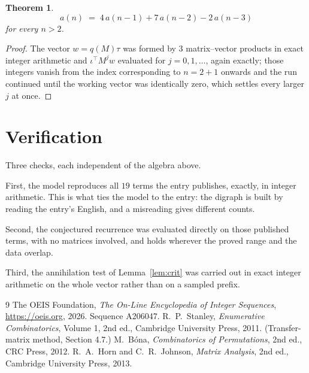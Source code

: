 \documentclass[11pt,a4paper]{article}
\theoremstyle{plain}
\newtheorem{theorem}{Theorem}
\theoremstyle{definition}
\begin{document}
\begin{theorem}
\[
a(n)\;=\;4\,a(n-1) + 7\,a(n-2) - 2\,a(n-3)
\]
for every $n>2$.
\end{theorem}

\begin{proof}
The vector $w=q(M)\tau$ was formed by $3$ matrix--vector products in exact integer
arithmetic and $\iota^{\!\top}M^{j}w$ evaluated for $j=0,1,\dots$, again exactly; those
integers vanish from the index corresponding to $n=2+1$ onwards and the run continued
until the working vector was identically zero, which settles every larger $j$ at once.
\end{proof}

\section{Verification}

Three checks, each independent of the algebra above.

First, the model reproduces all $19$ terms the entry publishes, exactly, in integer
arithmetic. This is what ties the model to the entry: the digraph is built by reading the
entry's English, and a misreading gives different counts.

Second, the conjectured recurrence was evaluated directly on those published terms, with no
matrices involved, and holds wherever the proved range and the data overlap.

Third, the annihilation test of Lemma~\ref{lem:crit} was carried out in exact integer
arithmetic on the whole vector rather than on a sampled prefix.

\begin{thebibliography}{9}
 The OEIS Foundation, \emph{The On-Line Encyclopedia of Integer
Sequences}, \url{https://oeis.org}, 2026. Sequence A206047.
 R.~P.~Stanley, \emph{Enumerative Combinatorics}, Volume 1, 2nd ed.,
Cambridge University Press, 2011. (Transfer-matrix method, Section 4.7.)
 M.~B\'ona, \emph{Combinatorics of Permutations}, 2nd ed., CRC
Press, 2012.
 R.~A.~Horn and C.~R.~Johnson, \emph{Matrix Analysis}, 2nd ed., Cambridge
University Press, 2013.
\end{thebibliography}
\end{document}
